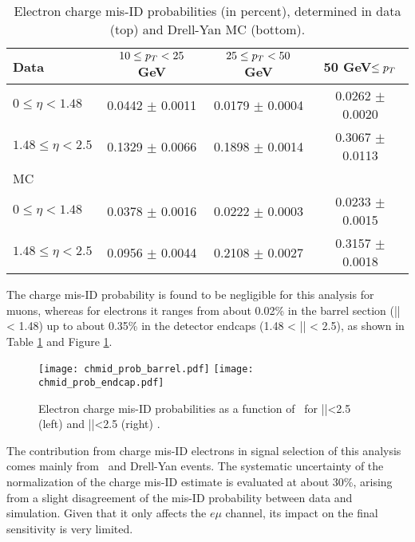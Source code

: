 \begin{table}[htp]
\centering
\begin{tabular}{lccc}\hline
 Data                & $10\leq p_T<25$ GeV  & $25\leq p_T<50$ GeV  & 50 GeV$\leq p_T$ \\\hline
$0\leq\eta<1.48$     & 0.0442 $\pm$ 0.0011 & 0.0179 $\pm$ 0.0004 & 0.0262 $\pm$ 0.0020 \\
$1.48\leq\eta<2.5$   & 0.1329 $\pm$ 0.0066 & 0.1898 $\pm$ 0.0014 & 0.3067 $\pm$ 0.0113 \\\hline
 MC                  &                     &                     &                      \\\hline
$0\leq\eta<1.48$     & 0.0378 $\pm$ 0.0016 & 0.0222 $\pm$ 0.0003 & 0.0233 $\pm$ 0.0015 \\
$1.48\leq\eta<2.5$   & 0.0956 $\pm$ 0.0044 & 0.2108 $\pm$ 0.0027 & 0.3157 $\pm$ 0.0018 \\\hline
\end{tabular}
\caption[Electron charge mis-ID probabilities.]{Electron charge mis-ID probabilities (in percent), determined in data (top) and Drell-Yan MC (bottom)\cite{CMS_AN_2017-029}.}
\label{tab:chmisid_prob}
\end{table}

The charge mis-ID probability is found to be negligible for this analysis for muons, whereas for
electrons it ranges from about 0.02\% in the barrel section (|\etac| < 1.48) up to about 0.35\% in the detector endcaps (1.48 < |\etac| < 2.5), as shown in Table \ref{tab:chmisid_prob} and Figure \ref{fig:chmisid_prob}.

\begin{figure}[htp]
\centering
\texttt{[image: chmid\_prob\_barrel.pdf]}
\texttt{[image: chmid\_prob\_endcap.pdf]}
\caption[Elecron mis-ID probabilities.]{Electron charge mis-ID probabilities as a function of \pt\ for |\etac|<2.5 (left) and |\etac|<2.5 (right) \cite{CMS_AN_2017-029}.}
\label{fig:chmisid_prob}
\end{figure}                            

The contribution from charge mis-ID electrons in signal selection of this analysis comes mainly from \ttbar\ and Drell-Yan events. The systematic uncertainty of the normalization of the charge mis-ID estimate is evaluated at about 30\%, arising from a slight disagreement of the mis-ID probability between data and simulation. Given that it only affects the $e\mu$ channel, its impact on the final sensitivity is very limited.

